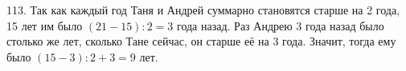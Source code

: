 113. Так как каждый год Таня и Андрей суммарно становятся старше на 2 года, 15 лет им было $(21-15):2=3$ года назад. Раз Андрею 3 года назад было столько же лет, сколько Тане сейчас, он старше её на 3 года. Значит, тогда ему было $(15-3):2+3=9$ лет.\\
